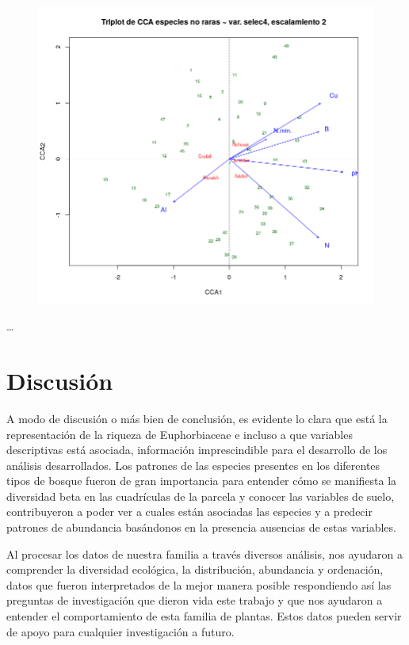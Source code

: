 \documentclass[11pt,]{article}
\begin{document}
\begin{figure}
\centering
\includegraphics{no_raras.png}
\caption{\label{fig:no_raras}}
\end{figure}

\ldots

\section{Discusión}\label{discusiuxf3n}

A modo de discusión o más bien de conclusión, es evidente lo clara que
está la representación de la riqueza de Euphorbiaceae e incluso a que
variables descriptivas está asociada, información imprescindible para el
desarrollo de los análisis desarrollados. Los patrones de las especies
presentes en los diferentes tipos de bosque fueron de gran importancia
para entender cómo se manifiesta la diversidad beta en las cuadrículas
de la parcela y conocer las variables de suelo, contribuyeron a poder
ver a cuales están asociadas las especies y a predecir patrones de
abundancia basándonos en la presencia ausencias de estas variables.

Al procesar los datos de nuestra familia a través diversos análisis, nos
ayudaron a comprender la diversidad ecológica, la distribución,
abundancia y ordenación, datos que fueron interpretados de la mejor
manera posible respondiendo así las preguntas de investigación que
dieron vida este trabajo y que nos ayudaron a entender el comportamiento
de esta familia de plantas. Estos datos pueden servir de apoyo para
cualquier investigación a futuro.
\end{document}
